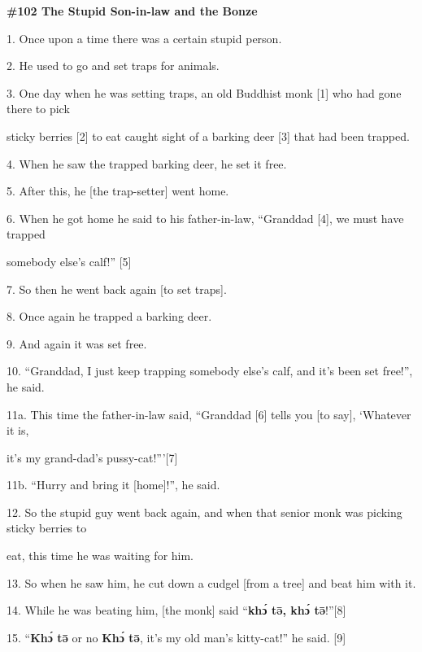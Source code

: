 
{\Large{}\textbf{\#102 The Stupid Son-in-law and the Bonze}}

{\Large{}1. Once upon a time there was a certain stupid person.}

{\Large{}2. He used to go and set traps for animals.}

{\Large{}3. One day when he was setting traps, an old Buddhist monk [1] who had
gone there to pick     }

{\Large{}sticky berries [2] to eat caught sight of a barking deer [3] that had
been trapped.}

{\Large{}4. When he saw the trapped barking deer, he set it free.}

{\Large{}5. After this, he [the trap-setter] went home.}

{\Large{}6. When he got home he said to his father-in-law, ``Granddad [4], we must
have trapped     }

{\Large{}somebody else's calf!'' [5]}

{\Large{}7. So then he went back again [to set traps].}

{\Large{}8. Once again he trapped a barking deer.}

{\Large{}9. And again it was set free.}

{\Large{}10. ``Granddad, I just keep trapping somebody else's calf, and it's been
set free!'', he said.}

{\Large{}11a. This time the father-in-law said, ``Granddad [6] tells you [to say],
`Whatever it is,        }

{\Large{}it's my grand-dad's pussy-cat!'''[7]}

{\Large{}11b. ``Hurry and bring it [home]!'', he said.}

{\Large{}12. So the stupid guy went back again, and when that senior monk was picking
sticky berries to       }

{\Large{}eat, this time he was waiting for him.}

{\Large{}13. So when he saw him, he cut down a cudgel [from a tree] and beat him
with it.}

{\Large{}14. While he was beating him, [the monk] said ``}{\Large{}\textbf{khɔ́
tə̄, khɔ́ tə̄}}{\Large{}!''[8]}

{\Large{}15. ``}{\Large{}\textbf{Khɔ́ tə̄}}{\Large{} or no }{\Large{}\textbf{Khɔ́
tə̄}}{\Large{},}{\Large{}\textbf{ }}{\Large{}it's my old man's kitty-cat!'' he
said. [9]}

